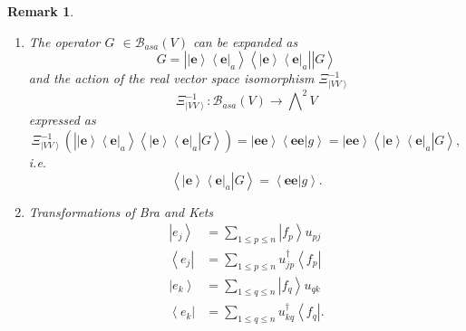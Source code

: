 \documentclass[aps,preprint]{revtex4}%
\newtheorem{remark}[theorem]{Remark}
\begin{document}
\begin{remark}
\begin{enumerate}
\item The operator $G$ $\in\mathcal{B}_{asa}\left(  V\right)  $ can be
expanded as \label{06/30/2025 copy(1)}
\begin{equation}
G=\left\vert \overset{}{\left\vert \mathbf{e}\right\rangle \left\langle
\mathbf{e}\right\vert _{a}}\right\rangle \left\langle \overset{}{\left\vert
\mathbf{e}\right\rangle \left\langle \mathbf{e}\right\vert }_{a}\right\vert
\left\vert \overset{}{G}\right\rangle
\end{equation}
and the action of the real \emph{vector space isomorphism} $\mathcal{\Xi
}_{\left\vert VV\right\rangle }^{-1}$
\begin{equation}
\mathcal{\Xi}_{\left\vert VV\right\rangle }^{-1}:\mathcal{B}_{asa}\left(
V\right)  \rightarrow%
{\textstyle\bigwedge\nolimits^{2}}
V
\end{equation}
expressed as
\begin{equation}
\mathcal{\Xi}_{\left\vert VV\right\rangle }^{-1}\left(  \overset{}{\left\vert
\overset{}{\left\vert \mathbf{e}\right\rangle \left\langle \mathbf{e}%
\right\vert _{a}}\right\rangle \left\langle \left.  \overset{}{\left\vert
\mathbf{e}\right\rangle \left\langle \mathbf{e}\right\vert }_{a}\right\vert
\overset{}{G}\right\rangle }\right)  =\left\vert \overset{}{\mathbf{ee}%
}\right\rangle \left\langle \left.  \overset{}{\mathbf{ee}}\right\vert
\overset{}{g}\right\rangle =\left\vert \overset{}{\mathbf{ee}}\right\rangle
\left\langle \left.  \overset{}{\left\vert \mathbf{e}\right\rangle
\left\langle \mathbf{e}\right\vert _{a}}\right\vert \overset{}{G}\right\rangle
,
\end{equation}
i.e.
\begin{equation}
\left\langle \left.  \overset{}{\left\vert \mathbf{e}\right\rangle
\left\langle \mathbf{e}\right\vert }_{a}\right\vert \overset{}{G}\right\rangle
=\left\langle \left.  \overset{}{\mathbf{ee}}\right\vert \overset{}{g}%
\right\rangle .
\end{equation}


\item Transformations of Bra and Kets
\begin{align}
\left\vert e_{j}\right\rangle  &  =\sum_{1\leq p\leq n}\left\vert
f_{p}\right\rangle u_{pj}\\
\left\langle e_{j}\right\vert  &  =\sum_{1\leq p\leq n}u_{jp}^{\dagger
}\left\langle f_{p}\right\vert \\
\left\vert e_{k}\right\rangle  &  =\sum_{1\leq q\leq n}\left\vert
f_{q}\right\rangle u_{qk}\\
\left\langle e_{k}\right\vert  &  =\sum_{1\leq q\leq n}u_{kq}^{\dagger
}\left\langle f_{q}\right\vert .
\end{align}



\end{enumerate}
\end{remark}
\end{document}
